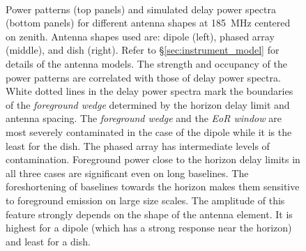 \documentclass[preprint2,iop,numberedappendix,twocolappendix,appendixfloats]{emulateapj}
\begin{document}
\begin{figure}[htb]
\centering
 \\
\caption{Power patterns (top panels) and simulated delay power spectra (bottom panels) for different antenna shapes at 185~MHz centered on zenith. Antenna shapes used are: dipole (left), phased array (middle), and dish (right). Refer to \S\ref{sec:instrument_model} for details of the antenna models. The strength and occupancy of the power patterns are correlated with those of delay power spectra. White dotted lines in the delay power spectra mark the boundaries of the {\it foreground wedge} determined by the horizon delay limit and antenna spacing. The {\it foreground wedge} and the {\it EoR window} are most severely contaminated in the case of the dipole while it is the least for the dish. The phased array has intermediate levels of contamination. Foreground power close to the horizon delay limits in all three cases are significant even on long baselines. The foreshortening of baselines towards the horizon makes them sensitive to foreground emission on large size scales. The amplitude of this feature strongly depends on the shape of the antenna element. It is highest for a dipole (which has a strong response near the horizon) and least for a dish.}
\label{fig:aperture-shapes}
\end{figure}
\end{document}
